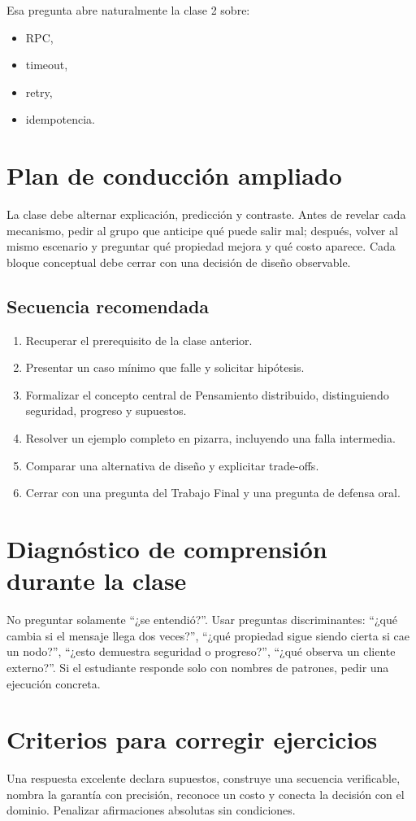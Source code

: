 \documentclass[variant=docente,cover=institutional,mode=screen]{ua-engineering-v6-article}
\begin{document}
Esa pregunta abre naturalmente la clase 2 sobre:
\begin{itemize}
\item RPC,
\item timeout,
\item retry,
\item idempotencia.
\end{itemize}


\section{Plan de conducción ampliado}
La clase debe alternar explicación, predicción y contraste. Antes de revelar cada mecanismo, pedir al grupo que anticipe qué puede salir mal; después, volver al mismo escenario y preguntar qué propiedad mejora y qué costo aparece. Cada bloque conceptual debe cerrar con una decisión de diseño observable.
\subsection*{Secuencia recomendada}
\begin{enumerate}
\item Recuperar el prerequisito de la clase anterior.
\item Presentar un caso mínimo que falle y solicitar hipótesis.
\item Formalizar el concepto central de Pensamiento distribuido, distinguiendo seguridad, progreso y supuestos.
\item Resolver un ejemplo completo en pizarra, incluyendo una falla intermedia.
\item Comparar una alternativa de diseño y explicitar trade-offs.
\item Cerrar con una pregunta del Trabajo Final y una pregunta de defensa oral.
\end{enumerate}
\section{Diagnóstico de comprensión durante la clase}
No preguntar solamente ``¿se entendió?''. Usar preguntas discriminantes: ``¿qué cambia si el mensaje llega dos veces?'', ``¿qué propiedad sigue siendo cierta si cae un nodo?'', ``¿esto demuestra seguridad o progreso?'', ``¿qué observa un cliente externo?''. Si el estudiante responde solo con nombres de patrones, pedir una ejecución concreta.
\section{Criterios para corregir ejercicios}
Una respuesta excelente declara supuestos, construye una secuencia verificable, nombra la garantía con precisión, reconoce un costo y conecta la decisión con el dominio. Penalizar afirmaciones absolutas sin condiciones.
\end{document}
